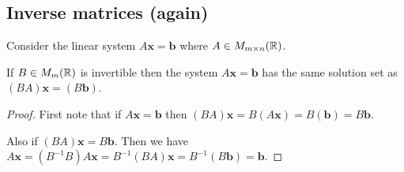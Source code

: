\documentclass[10pt, a4paper]{article}
\newcommand{\mbf}[1]{\mathbf{#1}}
\begin{document}
\subsection{Inverse matrices (again)}
Consider the linear system $A\mbf{x} = \mbf{b}$ where $A \in M_{m \times n}(\mathbb{R})$.
\begin{lemma}
    If $B \in M_m(\mathbb{R})$ is invertible then the system $A\mbf{x} = \mbf{b}$ has the same solution set as $(BA)\mbf{x} = (B\mbf{b})$.
    \begin{proof}
        First note that if $A\mbf{x} = \mbf{b}$ then
        $(BA)\mbf{x} = B(A\mbf{x}) = B(\mbf{b}) = B\mbf{b}$.

        Also if $(BA)\mbf{x} = B\mbf{b}$.
        Then we have
        $A\mbf{x} = (B ^ {-1} B)A\mbf{x} = B ^ {-1}(BA)\mbf{x} = B ^ {-1}(B\mbf{b}) = \mbf{b}$.
    \end{proof}
\end{lemma}
\end{document}
